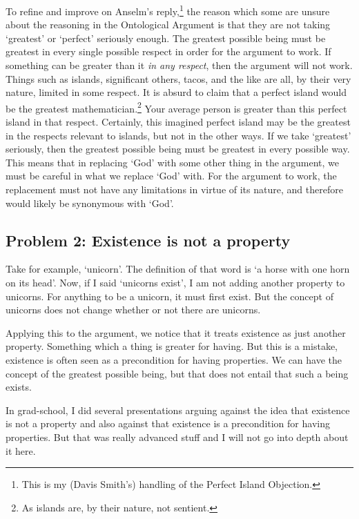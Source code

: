  To refine and improve on Anselm's reply,\footnote{This is my (Davis Smith's) handling of the Perfect Island Objection.} the reason which some are unsure about the reasoning in the Ontological Argument is that they are not taking `greatest' or `perfect' seriously enough. The greatest possible being must be greatest in every single possible respect in order for the argument to work. If something can be greater than it \emph{in any respect}, then the argument will not work. Things such as islands, significant others, tacos, and the like are all, by their very nature, limited in some respect. It is absurd to claim that a perfect island would be the greatest mathematician.\footnote{As islands are, by their nature, not sentient.} Your average person is greater than this perfect island in that respect. Certainly, this imagined perfect island may be the greatest in the respects relevant to islands, but not in the other ways. If we take `greatest' seriously, then the greatest possible being must be greatest in every possible way. This means that in replacing `God' with some other thing in the argument, we must be careful in what we replace `God' with. For the argument to work, the replacement must not have any limitations in virtue of its nature, and therefore would likely be synonymous with `God'.  
 
\subsection{Problem 2: Existence is not a property}

Take for example, ‘unicorn’. The definition of that word is ‘a horse with one horn on its head’. Now, if I said ‘unicorns exist’, I am not adding another property to unicorns. For anything to be a unicorn, it must first exist. But the concept of unicorns does not change whether or not there are unicorns.

Applying this to the argument, we notice that it treats existence as just another property. Something which a thing is greater for having. But this is a mistake, existence is often seen as a precondition for having properties. We can have the concept of the greatest possible being, but that does not entail that such a being exists.

In grad-school, I did several presentations arguing against the idea that existence is not a property and also against that existence is a precondition for having properties. But that was really advanced stuff and I will not go into depth about it here.

